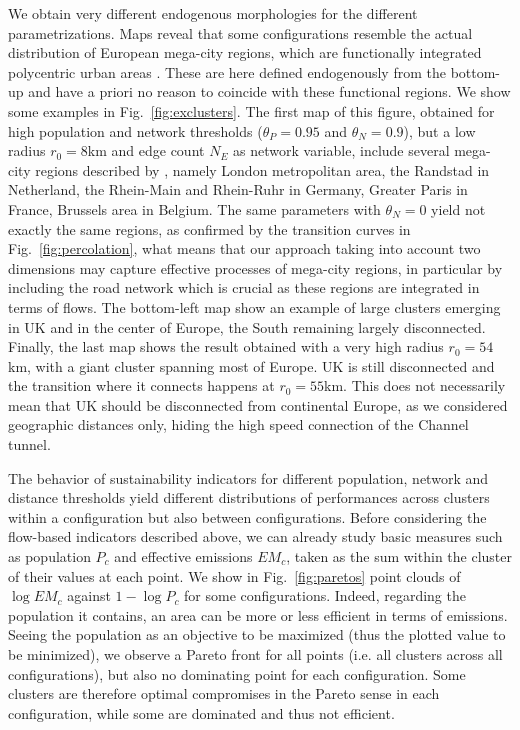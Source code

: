 \documentclass{article}
\begin{document}
We obtain very different endogenous morphologies for the different parametrizations. Maps reveal that some configurations resemble the actual distribution of European mega-city regions, which are functionally integrated polycentric urban areas \citep{hall2006polycentric}. These are here defined endogenously from the bottom-up and have a priori no reason to coincide with these functional regions. We show some examples in Fig.~\ref{fig:exclusters}. The first map of this figure, obtained for high population and network thresholds ($\theta_P = 0.95$ and $\theta_N = 0.9$), but a low radius $r_0 = 8$km and edge count $N_E$ as network variable, include several mega-city regions described by \citep{hall2006polycentric}, namely London metropolitan area, the Randstad in Netherland, the Rhein-Main and Rhein-Ruhr in Germany, Greater Paris in France, Brussels area in Belgium. The same parameters with $\theta_N = 0$ yield not exactly the same regions, as confirmed by the transition curves in Fig.~\ref{fig:percolation}, what means that our approach taking into account two dimensions may capture effective processes of mega-city regions, in particular by including the road network which is crucial as these regions are integrated in terms of flows. The bottom-left map show an example of large clusters emerging in UK and in the center of Europe, the South remaining largely disconnected. Finally, the last map shows the result obtained with a very high radius $r_0 = 54$km, with a giant cluster spanning most of Europe. UK is still disconnected and the transition where it connects happens at $r_0 = 55$km. This does not necessarily mean that UK should be disconnected from continental Europe, as we considered geographic distances only, hiding the high speed connection of the Channel tunnel.


The behavior of sustainability indicators for different population, network and distance thresholds yield different distributions of performances across clusters within a configuration but also between configurations. Before considering the flow-based indicators described above, we can already study basic measures such as population $P_c$ and effective emissions $EM_c$, taken as the sum within the cluster of their values at each point. We show in Fig.~\ref{fig:paretos} point clouds of $\log EM_c$ against $1 - \log P_c$ for some configurations. Indeed, regarding the population it contains, an area can be more or less efficient in terms of emissions. Seeing the population as an objective to be maximized (thus the plotted value to be minimized), we observe a Pareto front for all points (i.e. all clusters across all configurations), but also no dominating point for each configuration. Some clusters are therefore optimal compromises in the Pareto sense in each configuration, while some are dominated and thus not efficient.
\end{document}
